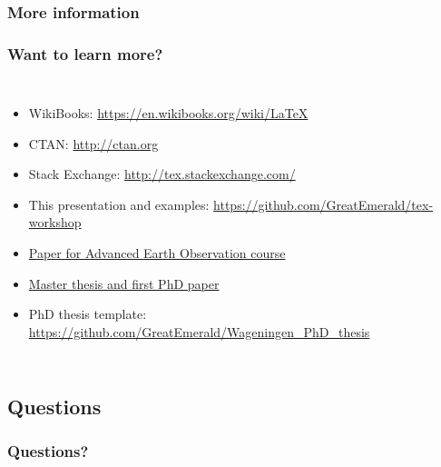 \documentclass[xetex,colorlinks]{beamer} %
\begin{document}
  \subsubsection{More information}
  \begin{frame}
    \frametitle{Want to learn more?}
    \begin{columns}
      \begin{itemize}
	\item WikiBooks: \href{https://en.wikibooks.org/wiki/LaTeX}{https://en.wikibooks.org/wiki/LaTeX}
	\item CTAN: \href{http://ctan.org}{http://ctan.org}
	\item Stack Exchange: \href{http://tex.stackexchange.com/}{http://tex.stackexchange.com/}
	\item This presentation and examples: \href{https://github.com/GreatEmerald/tex-workshop}{https://github.com/GreatEmerald/tex-workshop}
	\item \href{https://github.com/GreatEmerald/AEO-validation-paper/tree/master/paper}{Paper for Advanced Earth Observation course}
	\item \href{https://github.com/GreatEmerald/master-classification/tree/master/thesis}{Master thesis and first PhD paper}
	\item PhD thesis template: \href{https://github.com/GreatEmerald/Wageningen\_PhD\_thesis}{https://github.com/GreatEmerald/Wageningen\_PhD\_thesis}
      \end{itemize}
      
    \end{columns}
  \end{frame}
  
  \subsection{Questions}
  \begin{frame}
    \frametitle{Questions?}
    \tableofcontents[sectionstyle=shaded/show,subsectionstyle=shaded/shaded/show,subsubsectionstyle=shaded/shaded/shaded/show]
  \end{frame}

  
\end{document}

